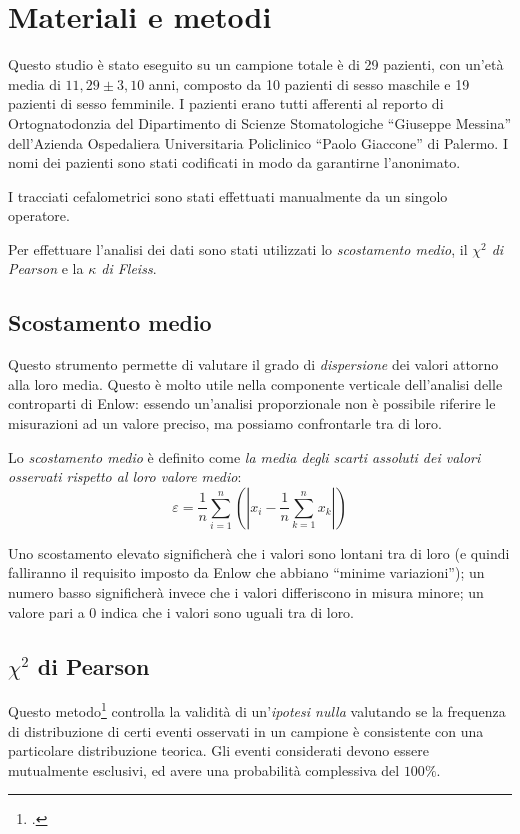 \chapter{Materiali e metodi}
Questo studio è stato eseguito su un campione totale è di 29 pazienti, con un'età media di $11,29 \pm 3,10$ anni, composto da 10 pazienti di sesso maschile e 19 pazienti di sesso femminile. I pazienti erano tutti afferenti al reporto di Ortognatodonzia del Dipartimento di Scienze Stomatologiche ``Giuseppe Messina'' dell'Azienda Ospedaliera Universitaria Policlinico ``Paolo Giaccone'' di Palermo. I nomi dei pazienti sono stati codificati in modo da garantirne l'anonimato.

I tracciati cefalometrici sono stati effettuati manualmente da un singolo operatore. 

Per effettuare l'analisi dei dati sono stati utilizzati lo \emph{scostamento medio}, il \emph{$\chi^2$ di Pearson} e la \emph{$\kappa$ di Fleiss}.

\section{Scostamento medio}
\label{scostamento_medio}
Questo strumento permette di valutare il grado di \emph{dispersione} dei valori attorno alla loro media. Questo è molto utile nella componente verticale dell'analisi delle controparti di Enlow: essendo un'analisi proporzionale non è possibile riferire le misurazioni ad un valore preciso, ma possiamo confrontarle tra di loro.

Lo \emph{scostamento medio} è definito come \emph{la media degli scarti assoluti dei valori osservati rispetto al loro valore medio}:
\begin{equation}
\label{eq:scostamento_medio}
\varepsilon = \frac{1}{n}\sum_{i=1}^n{\left(\left|x_i - \frac{1}{n}\sum_{k=1}^n x_k\right|\right)}
\end{equation}

Uno scostamento elevato significherà che i valori sono lontani tra di loro (e quindi falliranno il requisito imposto da Enlow che abbiano ``minime variazioni''); un numero basso significherà invece che i valori differiscono in misura minore; un valore pari a 0 indica che i valori sono uguali tra di loro.

\section{$\chi^2$ di Pearson}
\label{sec:chi-square}
Questo metodo\footcite{Plackett1983} controlla la validità di un'\emph{ipotesi nulla} valutando se la frequenza di distribuzione di certi eventi osservati in un campione è consistente con una particolare distribuzione teorica. Gli eventi considerati devono essere mutualmente esclusivi, ed avere una probabilità complessiva del $100\%$. %

